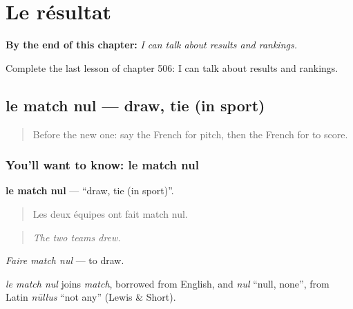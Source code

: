 
\chapter{Le résultat}
\label{ch:fr-le-resultat}

\begin{chapteropening}
\textbf{By the end of this chapter:} \emph{I can talk about results and rankings.}

Complete the last lesson of chapter 506: I can talk about results and rankings.
\end{chapteropening}

\section[le match nul]{le match nul — draw, tie (in sport)}

\label{lesson:FR-C506-match-nul}



\begin{quote}
Before the new one: say the French for pitch, then the French for to score.
\end{quote}

\subsection*{You'll want to know: le match nul}
\textbf{le match nul} — \textquotedblleft{}draw, tie (in sport)\textquotedblright{}.

\begin{quote}
Les deux équipes ont fait match nul.
\end{quote}

\begin{quote}
\emph{The two teams drew.}
\end{quote}

\emph{Faire match nul} — to draw.

\begin{cousinweb}
\emph{le match nul} joins \emph{match}, borrowed from English, and \emph{nul} \textquotedblleft{}null, none\textquotedblright{}, from Latin \emph{nūllus} \textquotedblleft{}not any\textquotedblright{} (Lewis \& Short).
\end{cousinweb}

